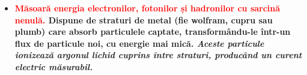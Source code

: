 \documentclass{beamer}
\begin{document}
\begin{frame}{}

\vspace{-3cm}


\begin{itemize}

\small
\item[\ding{88}]\makebox[0.5cm]{} \textbf{\textcolor{red}{Măsoară energia electronilor, fotonilor și hadronilor cu sarcină nenulă.} Dispune de straturi de metal (fie wolfram, cupru sau plumb) care absorb particulele captate, transformându-le într-un flux de particule noi, cu energie mai mică. \textit{Aceste particule ionizează argonul lichid cuprins între straturi, producând un curent electric măsurabil.}}

\end{itemize}



\end{frame}
\end{document}
